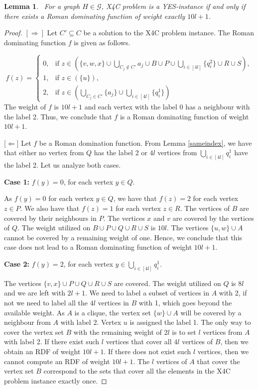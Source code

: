 \documentclass[preprint,12pt]{elsarticle}
\newtheorem{lemma}{Lemma}
\begin{document}
\begin{lemma}~\label{g1}
    For a graph $H \in \mathcal{G}$, X4C problem is a YES-instance if and only if there exists a Roman dominating function of weight exactly $10l+1$.
\end{lemma}
\begin{proof}
        $[\Rightarrow]$ Let $C' \subseteq C$ be a solution to the X4C problem instance. The Roman dominating function $f$ is given as follows.

    \[f(z) = \begin{cases}
0, & \text{if } z \in \left( \{v,w,x\} \cup \bigcup\limits_{C_j \notin C'}a_j \cup B \cup P \cup \bigcup\limits_{i\in[4l]} \{q_i^2\} \cup R \cup S \right), \\
1, & \text{if } z \in \left(\{ u \}\right), \\
2, & \text{if } z \in \left(\bigcup\limits_{C_j \in C'} \{a_j\} \cup \bigcup\limits_{i\in[4l]} \{q_i^1\} \right)
\end{cases}
\]
The weight of $f$ is $10l+1$ and each vertex with the label 0 has a neighbour with the label 2. Thus, we conclude that $f$ is a Roman dominating function of weight $10l+1$.

    [$\Leftarrow$] Let $f$ be a Roman domination function. From Lemma \ref{sameindex}, we have that either no vertex from $Q$ has the label 2 or $4l$ vertices from $\bigcup\limits_{i \in [4l]} q_i^1$ have the label 2. Let us analyze both cases.

\medskip\noindent
    \textbf{Case 1:} $f(y) = 0$, for each vertex $y \in Q$.

    As $f(y) = 0$ for each vertex $y \in Q$, we have that $f(z) = 2$ for each vertex $z \in P$. We also have that $f(z) = 1$ for each vertex $z \in R$. The vertices of $B$ are covered by their neighbours in $P$. The vertices $x$ and $v$ are covered by the vertices of $Q$. The weight utilized on $B \cup P \cup Q \cup R \cup S$ is $10l$. The vertices $\{u, w\} \cup A$ cannot be covered by a remaining weight of one. Hence, we conclude that this case does not lead to a Roman dominating function of weight $10l+1$.  

    \medskip\noindent
    \textbf{Case 2:} $f(y) = 2$, for each vertex $y \in \bigcup\limits_{i \in [4l]} q_i^1$.

    The vertices $\{v,x\} \cup P \cup Q \cup R \cup S$ are covered. The weight utilized on $Q$ is $8l$ and we are left with $2l+1$. We need to label a subset of vertices in $A$ with 2, if not we need to label all the $4l$ vertices in $B$ with 1, which goes beyond the available weight. As $A$ is a clique, the vertex set $\{w\} \cup A$ will be covered by a neighbour from $A$ with label 2. Vertex $u$ is assigned the label 1. The only way to cover the vertex set $B$ with the remaining weight of $2l$ is to set $l$ vertices from $A$ with label 2. If there exist such $l$ vertices that cover all $4l$ vertices of $B$, then we obtain an RDF of weight $10l+1$. If there does not exist such $l$ vertices, then we cannot compute an RDF of weight $10l+1$. The $l$ vertices of $A$ that cover the vertex set $B$ correspond to the sets that cover all the elements in the X4C problem instance exactly once. 
\end{proof}
\end{document}
